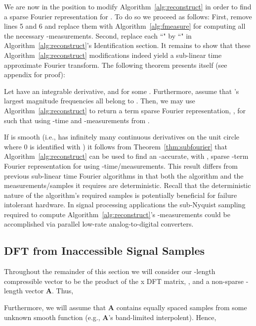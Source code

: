 \documentclass{article}
\begin{document}
We are now in the position to modify Algorithm~\ref{alg:reconstruct} in order to find a sparse Fourier representation for .  To do so we proceed as follows:  First, remove lines 5 and 6 and replace them with Algorithm~\ref{alg:fmeasure} for computing all the necessary -measurements.  Second, replace each ``" by ``" in Algorithm~\ref{alg:reconstruct}'s {\sc Identification} section.  It remains to show that these Algorithm~\ref{alg:reconstruct} modifications indeed yield a sub-linear time approximate Fourier transform.  The following theorem presents itself (see appendix for proof):

\begin{Theorem}
Let  have  an integrable  derivative, and   for some .  Furthermore, assume that 's  largest magnitude frequencies all belong to .  Then, we may use Algorithm~\ref{alg:reconstruct} to return a  term sparse Fourier representation, , for  such that  using -time and -measurements from .
\label{thm:subfourier}
\end{Theorem}

If  is smooth (i.e., has infinitely many continuous derivatives on the unit circle where 0 is identified with ) it follows from Theorem~\ref{thm:subfourier} that Algorithm~\ref{alg:reconstruct} can be used to find an -accurate, with , sparse -term Fourier representation for  using -time/measurements.  This result differs from previous sub-linear time Fourier algorithms \cite{AAFFT1,AAFFT2} in that both the algorithm and the measurements/samples it requires are deterministic.  Recall that the deterministic nature of the algorithm's required samples is potentially beneficial for failure intolerant hardware.  In signal processing applications the sub-Nyquist sampling required to compute Algorithm~\ref{alg:reconstruct}'s -measurements could be accomplished via  parallel low-rate analog-to-digital converters.

\subsection{DFT from Inaccessible Signal Samples}
\label{sec:inaccessible}

Throughout the remainder of this section we will consider our -length compressible vector  to be the product of the  x  DFT matrix, \textbf{}, and a non-sparse -length vector \textbf{A}.  Thus,

Furthermore, we will assume that \textbf{A} contains equally spaced samples from some unknown smooth function  (e.g., \textbf{A}'s band-limited interpolent).  Hence,
\end{document}
